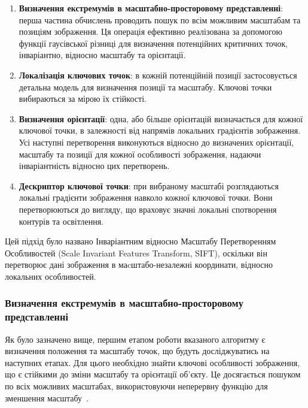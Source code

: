 \begin{enumerate}

\item \textbf{Визначення екстремумів в масштабно-просторовому представленні}: перша частина обчислень проводить пошук по всім можливим масштабам та позиціям зображення. Ця операція ефективно реалізована за допомогою функції гаусівської різниці для визначення потенційних критичних точок, інваріантно, відносно масштабу та орієнтації.

\item \textbf{Локалізація ключових точок}: в кожній потенційній позиції застосовується детальна модель для визначення позиції та масштабу. Ключові точки вибираються за мірою їх стійкості.

\item \textbf{Визначення орієнтації}: одна, або більше орієнтацій визначається для кожної ключової точки, в залежності від напрямів локальних градієнтів зображення. Усі наступні перетворення виконуються відносно до визначених орієнтації, масштабу та позиції для кожної особливості зображення, надаючи інваріантність відносно цих перетворень.

\item \textbf{Дескриптор ключової точки}: при вибраному масштабі розглядаються локальні градієнти зображення навколо кожної ключової точки. Вони перетворюються до вигляду, що враховує значні локальні спотворення контурів та освітлення.

\end{enumerate}

Цей підхід було названо Інваріантним відносно Масштабу Перетворенням Особливостей (Scale Invariant Features Transform, SIFT), оскільки він перетворює дані зображення в маcштабо-незалежні координати, відносно локальних особливостей.

\subsubsection{Визначення екстремумів в масштабно-просторовому представленні}
\label{sec:sift scale space extrema}

Як було зазначено вище, першим етапом роботи вказаного алгоритму є визначення положення та масштабу точок, що будуть досліджуватись на наступних етапах. Для цього необхідно знайти ключові особливості зображення, що є стійкими до зміни масштабу та орієнтації об'єкту. Це досягається пошуком по всіх можливих масштабах, використовуючи неперервну функцію для зменшення масштабу~\cite{Witkin83}. 

